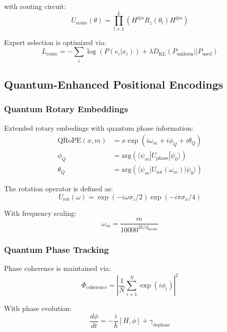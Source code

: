 \documentclass{article}
\begin{document}
with routing circuit:
\begin{equation}
U_{\text{route}}(\theta) = \prod_{l=1}^L \left(H^{\otimes n} R_z(\theta_l) H^{\otimes n}\right)
\end{equation}

Expert selection is optimized via:
\begin{equation}
L_{\text{route}} = -\sum_i \log(P(e_i|x_i)) + \lambda D_{\text{KL}}(P_{\text{uniform}}||P_{\text{used}})
\end{equation}

\subsection{Quantum-Enhanced Positional Encodings}

\subsubsection{Quantum Rotary Embeddings}
Extended rotary embedings with quantum phase information:
\begin{equation}
\begin{split}
\text{QRoPE}(x,m) &= x\exp(i\omega_m + i\phi_Q + i\theta_Q) \\
\phi_Q &= \text{arg}(\langle\psi_m|U_{\text{phase}}|\psi_0\rangle) \\
\theta_Q &= \text{arg}(\langle\psi_m|U_{\text{rot}}(\omega_m)|\psi_0\rangle)
\end{split}
\end{equation}

The rotation operator is defined as:
\begin{equation}
U_{\text{rot}}(\omega) = \exp(-i\omega \sigma_z/2) \exp(-i\pi \sigma_x/4)
\end{equation}

With frequency scaling:
\begin{equation}
\omega_m = \frac{m}{10000^{2k/d_{\text{model}}}}
\end{equation}

\subsubsection{Quantum Phase Tracking}
Phase coherence is maintained via:
\begin{equation}
\Phi_{\text{coherence}} = \left|\frac{1}{N}\sum_{i=1}^N \exp(i\phi_i)\right|^2
\end{equation}

With phase evolution:
\begin{equation}
\frac{d\phi}{dt} = -\frac{i}{\hbar}[H, \phi] + \gamma_{\text{dephase}}
\end{equation}
\end{document}
